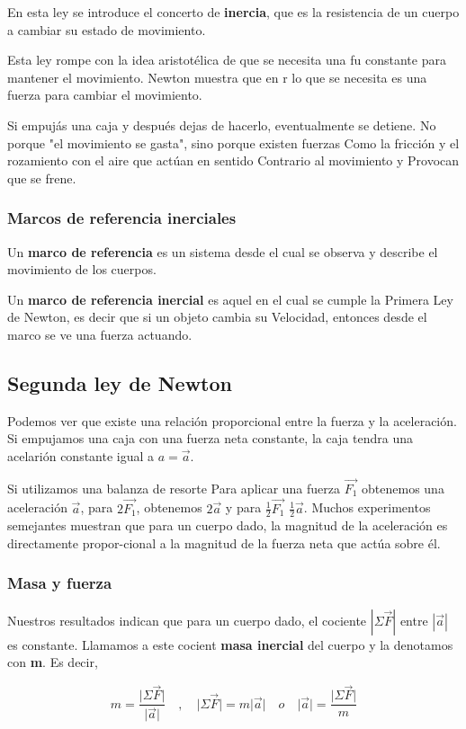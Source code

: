 \documentclass{article}
\newcommand{\newsubsection}[1]{
    \vspace{0.5cm}
    \color{sectionColor}
    \subsection{ #1}
    \color{black}
    \vspace{0.5cm}
}
\newcommand{\newtitle}[1]{
    \color{titleColor}
    \subsubsection{\textbf{#1}}
    \color{black}
}
\newcommand{\bl}[1]{\textbf{#1}}
\begin{document}
    \par En esta ley se introduce el concerto de \bl{inercia}, que es la resistencia de un cuerpo a cambiar su estado de movimiento.
    \par Esta ley rompe con la idea aristotélica de que se necesita una fu constante para mantener el movimiento. Newton muestra que en r lo que se necesita es una fuerza para cambiar el movimiento.
    \par Si empujás una caja y después dejas de hacerlo, eventualmente se detiene. No porque "el movimiento se gasta", sino porque existen fuerzas Como la fricción y el rozamiento con el aire que actúan en sentido Contrario al movimiento y Provocan que se frene.

    \newtitle{Marcos de referencia inerciales}

    \par Un \bl{marco de referencia} es un sistema desde el cual se observa y describe el movimiento de los cuerpos.
    \par Un \bl{marco de referencia inercial} es aquel en el cual se cumple la Primera Ley de Newton, es decir que si un objeto cambia su Velocidad, entonces desde el marco se ve una fuerza actuando.

    \newsubsection{Segunda ley de Newton}

    \par Podemos ver que existe una relación proporcional entre la fuerza y la aceleración. Si empujamos una caja con una fuerza neta constante, la caja tendra una acelarión constante igual a $a=\vec{a}$.
    \par Si utilizamos una balanza de resorte Para aplicar una fuerza $\vec{F_1}$ obtenemos una aceleración $\vec{a}$, para $2\vec{F_1}$, obtenemos $2\vec{a}$ y para $\frac{1}{2}\vec{F_1}$ $\frac{1}{2}\vec{a}$. Muchos experimentos semejantes muestran que para un cuerpo dado, la magnitud de la aceleración es directamente propor-cional a la magnitud de la fuerza neta que actúa sobre él.

    \newtitle{Masa y fuerza}

   \par Nuestros resultados indican que para un cuerpo dado, el cociente $\left\lvert \Sigma \vec{F}\right\rvert $ entre $\left\lvert \vec{a} \right\rvert $ es constante. Llamamos a este cocient \bl{masa inercial} del cuerpo y la denotamos con \bl{m}. Es decir,

    \[ m = \frac{\lvert \Sigma \vec{F}\rvert }{\lvert \vec{a} \rvert } \quad,\quad
    \lvert \Sigma \vec{F} \rvert = m \lvert \vec{a} \rvert \quad o \quad
    \lvert \vec{a} \rvert = \frac{\lvert \Sigma \vec{F}\rvert }{m}\]
\end{document}
